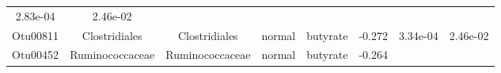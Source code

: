 \documentclass[11pt,]{article}
\begin{document}
\begin{longtable}[]{@{}cccccccc@{}}
\begin{minipage}[t]{0.08\columnwidth}
2.83e-04\strut
\end{minipage} & \begin{minipage}[t]{0.08\columnwidth}\centering\strut
2.46e-02\strut
\end{minipage}\tabularnewline
\begin{minipage}[t]{0.08\columnwidth}\centering\strut
Otu00811\strut
\end{minipage} & \begin{minipage}[t]{0.15\columnwidth}\centering\strut
Clostridiales\strut
\end{minipage} & \begin{minipage}[t]{0.15\columnwidth}\centering\strut
Clostridiales\strut
\end{minipage} & \begin{minipage}[t]{0.08\columnwidth}\centering\strut
normal\strut
\end{minipage} & \begin{minipage}[t]{0.09\columnwidth}\centering\strut
butyrate\strut
\end{minipage} & \begin{minipage}[t]{0.07\columnwidth}\centering\strut
-0.272\strut
\end{minipage} & \begin{minipage}[t]{0.08\columnwidth}\centering\strut
3.34e-04\strut
\end{minipage} & \begin{minipage}[t]{0.08\columnwidth}\centering\strut
2.46e-02\strut
\end{minipage}\tabularnewline
\begin{minipage}[t]{0.08\columnwidth}\centering\strut
Otu00452\strut
\end{minipage} & \begin{minipage}[t]{0.15\columnwidth}\centering\strut
Ruminococcaceae\strut
\end{minipage} & \begin{minipage}[t]{0.15\columnwidth}\centering\strut
Ruminococcaceae\strut
\end{minipage} & \begin{minipage}[t]{0.08\columnwidth}\centering\strut
normal\strut
\end{minipage} & \begin{minipage}[t]{0.09\columnwidth}\centering\strut
butyrate\strut
\end{minipage} & \begin{minipage}[t]{0.07\columnwidth}\centering\strut
-0.264\strut
\end{minipage} & \begin{minipage}[t]{0.08\columnwidth}\centering\strut

\end{minipage}
\end{longtable}
\end{document}
